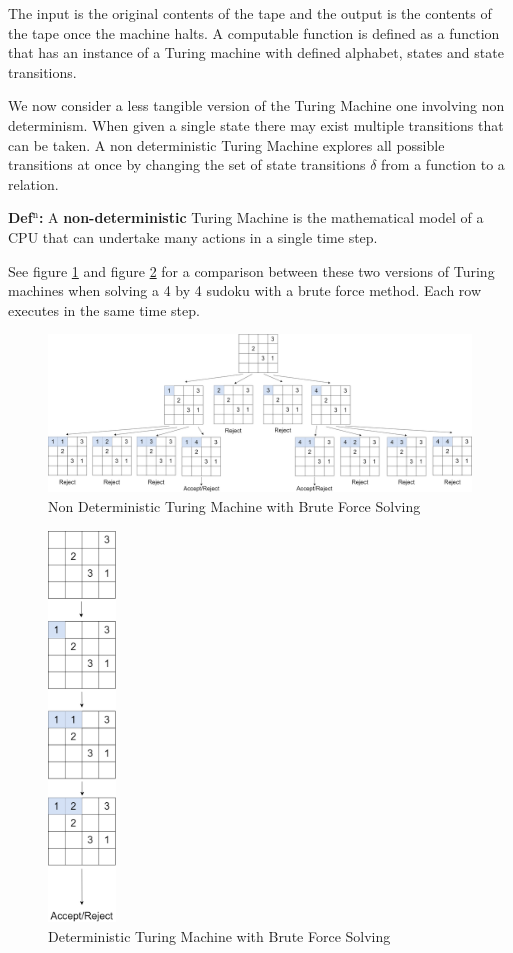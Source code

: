 \documentclass[a4paper,11pt]{report}
\newcounter{row}
\begin{document}
The input is the original contents of the tape and the output is the contents of the tape once the machine halts. A computable function is defined as a function that has an instance of a Turing machine with defined alphabet, states and state transitions.

We now consider a less tangible version of the Turing Machine one involving non determinism. When given a single state there may exist multiple transitions that can be taken. A non deterministic Turing Machine explores all possible transitions at once by changing the set of state transitions $\delta$ from a function to a relation. 

\textbf{Def$^\text{n}$:} A \textbf{non-deterministic} Turing Machine is the mathematical model of a CPU that can undertake many actions in a single time step.

See figure \ref{ndtm} and figure \ref{dtm} for a comparison between these two versions of Turing machines when solving a 4 by 4 sudoku with a brute force method. Each row executes in the same time step.

\begin{figure}[h!]
	\begin{center}
		\includegraphics[width=180mm]{figures/turing_non_determinism.png}
	\end{center}
	\caption{\label{ndtm} Non Deterministic Turing Machine with Brute Force Solving}
\end{figure}

\begin{figure}[h!]
	\begin{center}
		\includegraphics[width=18mm]{figures/turing_determinism.png}
	\end{center}
	\caption{\label{dtm} Deterministic Turing Machine with Brute Force Solving}
\end{figure}
\end{document}
